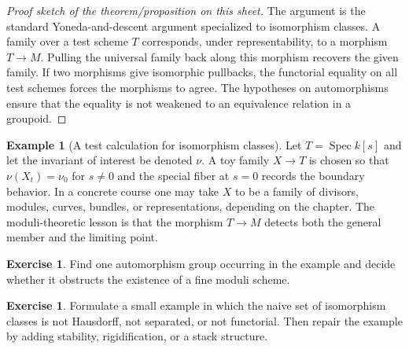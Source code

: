 \documentclass[11pt]{amsart}
\theoremstyle{definition}
\newtheorem{example}[theorem]{Example}
\newtheorem{exercise}[theorem]{Exercise}
\newcommand{\Spec}{\operatorname{Spec}}
\begin{document}
\begin{proof}[Proof sketch of the theorem/proposition on this sheet]
The argument is the standard Yoneda-and-descent argument specialized to isomorphism classes.  A family over a test scheme $T$ corresponds, under representability, to a morphism $T\to M$.  Pulling the universal family back along this morphism recovers the given family.  If two morphisms give isomorphic pullbacks, the functorial equality on all test schemes forces the morphisms to agree.  The hypotheses on automorphisms ensure that the equality is not weakened to an equivalence relation in a groupoid.
\end{proof}
\begin{example}[A test calculation for isomorphism classes]
Let $T=\Spec k[s]$ and let the invariant of interest be denoted $\nu$.  A toy family $X\to T$ is chosen so that $\nu(X_t)=\nu_0$ for $s\ne0$ and the special fiber at $s=0$ records the boundary behavior.  In a concrete course one may take $X$ to be a family of divisors, modules, curves, bundles, or representations, depending on the chapter.  The moduli-theoretic lesson is that the morphism $T\to M$ detects both the general member and the limiting point.
\end{example}
\begin{exercise}
Find one automorphism group occurring in the example and decide whether it obstructs the existence of a fine moduli scheme.
\end{exercise}
\begin{exercise}
Formulate a small example in which the naive set of isomorphism classes is not Hausdorff, not separated, or not functorial.  Then repair the example by adding stability, rigidification, or a stack structure.
\end{exercise}
\clearpage
\end{document}
